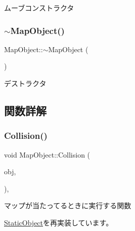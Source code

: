 ムーブコンストラクタ 

\mbox{\label{class_map_object_aa601344267a49df197e841fcbd732209}} 
\subsubsection{\texorpdfstring{$\sim$\+Map\+Object()}{~MapObject()}}
{\footnotesize\ttfamily Map\+Object\+::$\sim$\+Map\+Object (\begin{DoxyParamCaption}{ }\end{DoxyParamCaption})\hspace{0.3cm}{\ttfamily [inline]}}



デストラクタ 



\subsection{関数詳解}
\mbox{\label{class_map_object_a76b9161f2723272ad361d0b190e46245}} 
\subsubsection{\texorpdfstring{Collision()}{Collision()}}
{\footnotesize\ttfamily void Map\+Object\+::\+Collision (\begin{DoxyParamCaption}\item[{\mbox{\hyperlink{class_object_base}{Object\+Base}} $\ast$}]{obj,  }\item[{\mbox{\hyperlink{common_8h_ae148fff5818e9444b4ab2288829559bf}{Vec2}}}]{ }\end{DoxyParamCaption})\hspace{0.3cm}{\ttfamily [final]}, {\ttfamily [virtual]}}



マップが当たってるときに実行する関数 



\mbox{\hyperlink{class_static_object_a64c8803ff881d578d103413e299dbf7f}{Static\+Object}}を再実装しています。

\mbox{\label{class_map_object_ad4bcfdc33bd945a9aa5e50a57c2704bc}} 
